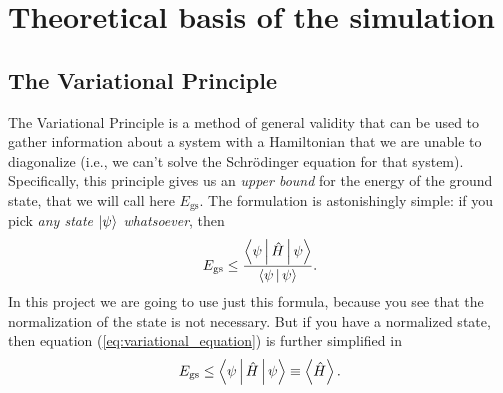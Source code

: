 
\graphicspath{{Mainmatter/figures/PNG/}{Mainmatter/figures/PDF/}{Mainmatter/figures/}}

\chapter{Theoretical basis of the simulation}

\section{The Variational Principle}
The Variational Principle is a method of general validity that can be used to gather information about a system with a Hamiltonian that we are unable to diagonalize (i.e., we can't solve the Schr\"{o}dinger equation for that system). Specifically, this principle gives us an \emph{upper bound} for the energy of the ground state, that we will call here $E_{\text{gs}}$. The formulation is astonishingly simple: if you pick \emph{any state $\Ket{\psi}$ whatsoever}, then
\begin{equation}
	E_{\text{gs}} \leq \frac{\Braket{\psi|\hat{H}|\psi}}{\Braket{\psi|\psi}}.
	\label{eq:variational_equation}
\end{equation}
In this project we are going to use just this formula, because you see that the normalization of the state is not necessary. But if you have a normalized state, then equation (\ref{eq:variational_equation}) is further simplified in
\begin{equation}
	E_{\text{gs}} \leq \Braket{\psi|\hat{H}|\psi} \equiv \Braket{\hat{H}}.
\end{equation}

